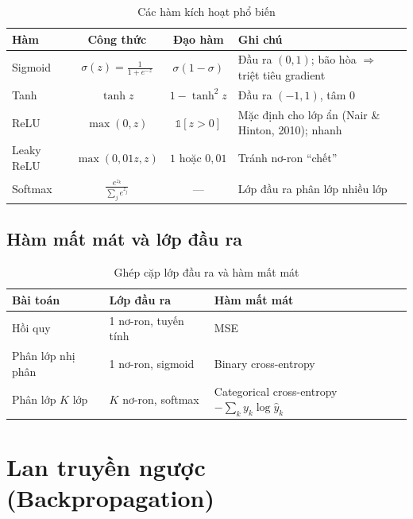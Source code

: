\begin{table}[H]
\centering
\begin{tabular}{|l|c|c|p{4.8cm}|}
\hline
\textbf{Hàm} & \textbf{Công thức} & \textbf{Đạo hàm} & \textbf{Ghi chú} \\
\hline
Sigmoid & $\sigma(z) = \frac{1}{1 + e^{-z}}$ & $\sigma(1 - \sigma)$ & Đầu ra $(0, 1)$; bão hòa $\Rightarrow$ triệt tiêu gradient \\[4pt] \hline
Tanh & $\tanh z$ & $1 - \tanh^2 z$ & Đầu ra $(-1, 1)$, tâm 0 \\[4pt] \hline
ReLU & $\max(0, z)$ & $\mathbb{1}[z > 0]$ & Mặc định cho lớp ẩn (Nair \& Hinton, 2010); nhanh \\[4pt] \hline
Leaky ReLU & $\max(0{,}01z, z)$ & $1$ hoặc $0{,}01$ & Tránh nơ-ron ``chết'' \\[4pt] \hline
Softmax & $\frac{e^{z_k}}{\sum_j e^{z_j}}$ & --- & Lớp đầu ra phân lớp nhiều lớp \\[4pt] \hline
\end{tabular}
\caption{Các hàm kích hoạt phổ biến}
\end{table}


\subsection{Hàm mất mát và lớp đầu ra}

\begin{table}[H]
\centering
\begin{tabular}{|l|l|l|}
\hline
\textbf{Bài toán} & \textbf{Lớp đầu ra} & \textbf{Hàm mất mát} \\
\hline
Hồi quy & 1 nơ-ron, tuyến tính & MSE \\ \hline
Phân lớp nhị phân & 1 nơ-ron, sigmoid & Binary cross-entropy \\ \hline
Phân lớp $K$ lớp & $K$ nơ-ron, softmax & Categorical cross-entropy $-\sum_k y_k \log \hat{y}_k$ \\ \hline
\end{tabular}
\caption{Ghép cặp lớp đầu ra và hàm mất mát}
\end{table}

\section{Lan truyền ngược (Backpropagation)}

